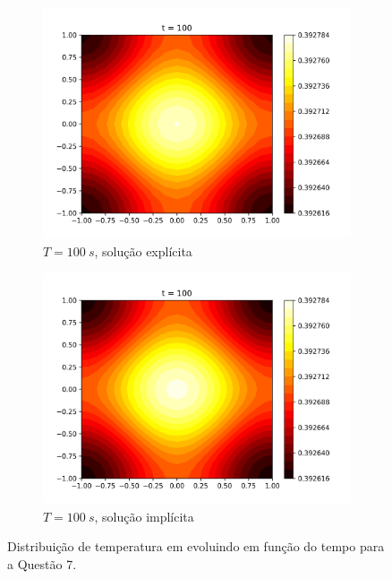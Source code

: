 \documentclass{article}
\begin{document}
\begin{figure}
\begin{subfigure}[b]{0.49\textwidth}
         \includegraphics[width=\textwidth]{figs/q7a_heatmap_t100.png}
         \caption{$T=100~s$, solução explícita}
	\label{fig:q7a_heatmap_t100}
     \end{subfigure}
     \hfill
     \begin{subfigure}[b]{0.49\textwidth}
         \centering
     \includegraphics[width=\textwidth]{figs/q7b_heatmap_t100.png}
         \caption{$T=100~s$, solução implícita}
	\label{fig:q7b_heatmap_t100}
     \end{subfigure}
\caption{Distribuição de temperatura em evoluindo em função do tempo para a Questão 7.}
\end{figure}
\end{document}
